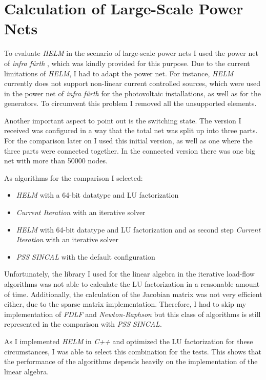 \section{Calculation of Large-Scale Power Nets}
\label{sec:large_scale_power nets}
	
To evaluate \emph{HELM} in the scenario of large-scale power nets I used the power net of \emph{infra fürth} , which was kindly provided for this purpose. Due to the current limitations of \emph{HELM}, I had to adapt the power net. For instance, \emph{HELM} currently does not support non-linear current controlled sources, which were used in the power net of \emph{infra fürth} for the photovoltaic installations, as well as for the generators. To circumvent this problem I removed all the unsupported elements.

Another important aspect to point out is the switching state. The version I received was configured in a way that the total net was split up into three parts. For the comparison later on I used this initial version, as well as one where the three parts were connected together. In the connected version there was one big net with more than 50000 nodes.

As algorithms for the comparison I selected:
\begin{itemize}
	\item \emph{HELM} with a 64-bit datatype and LU factorization
	\item \emph{Current Iteration} with an iterative solver
	\item \emph{HELM} with 64-bit datatype and LU factorization and as second step \emph{Current Iteration} with an iterative solver
	\item \emph{PSS SINCAL} with the default configuration
\end{itemize}
Unfortunately, the library I used for the linear algebra in the iterative load-flow algorithms was not able to calculate the LU factorization in a reasonable amount of time. Additionally, the calculation of the Jacobian matrix was not very efficient either, due to the sparse matrix implementation. Therefore, I had to skip my implementation of \emph{FDLF} and \emph{Newton-Raphson} but this class of algorithms is still represented in the comparison with \emph{PSS SINCAL}.

As I implemented \emph{HELM} in \emph{C++} and optimized the LU factorization for these circumstances, I was able to select this combination for the tests. This shows that the performance of the algorithms depends heavily on the implementation of the linear algebra.

